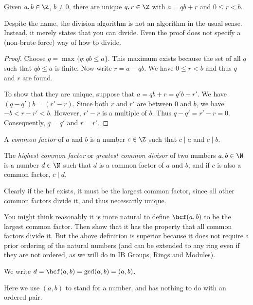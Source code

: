 \documentclass[a4paper]{article}
\begin{document}
\begin{thm}
  Given $a, b\in \Z$, $b \not= 0$, there are unique $q, r\in \Z$ with $a = qb + r$ and $0\leq r < b$.
\end{thm}
Despite the name, the division algorithm is not an algorithm in the usual sense. Instead, it merely states that you can divide. Even the proof does not specify a (non-brute force) way of how to divide.

\begin{proof}
  Choose $q = \max\{q : qb \leq a\}$. This maximum exists because the set of all $q$ such that $qb\leq a$ is finite. Now write $r = a - qb$. We have $0\leq r < b$ and thus $q$ and $r$ are found.

  To show that they are unique, suppose that $a = qb + r = q'b + r'$. We have $(q - q')b = (r' - r)$. Since both $r$ and $r'$ are between $0$ and $b$, we have $-b < r - r' < b$. However, $r' - r$ is a multiple of $b$. Thus $q - q' = r' - r = 0$. Consequently, $q = q'$ and $r = r'$.
\end{proof}

\begin{defi}
  A \emph{common factor} of $a$ and $b$ is a number $c\in\Z$ such that $c\mid a$ and $c\mid b$.
\end{defi}

\begin{defi}
  The \emph{highest common factor} or \emph{greatest common divisor} of two numbers $a, b\in \N$ is a number $d\in \N$ such that $d$ is a common factor of $a$ and $b$, and if $c$ is also a common factor, $c\mid d$.
\end{defi}
Clearly if the hcf exists, it must be the largest common factor, since all other common factors divide it, and thus necessarily unique.

You might think reasonably it is more natural to define $\hcf(a, b)$ to be the largest common factor. Then show that it has the property that all common factors divide it. But the above definition is superior because it does not require a prior ordering of the natural numbers (and can be extended to any ring even if they are not ordered, as we will do in IB Groups, Rings and Modules).


\begin{notation}
  We write $d = \hcf(a, b) = \gcd(a, b) = (a, b)$.

  Here we use $(a, b)$ to stand for a number, and has nothing to do with an ordered pair.
\end{notation}
\end{document}
